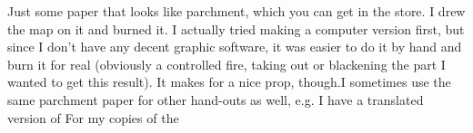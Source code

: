 Just some paper that looks like parchment, which you can get in the store. I drew the map on it and burned it. I actually tried making a computer version first, but since I don't have any decent graphic software, it was easier to do it by hand and burn it for real (obviously a controlled fire, taking out or blackening the part I wanted to get this result). It makes for a nice prop, though.I sometimes use the same parchment paper for other hand-outs as well, e.g. I have a translated version of For my copies of the 